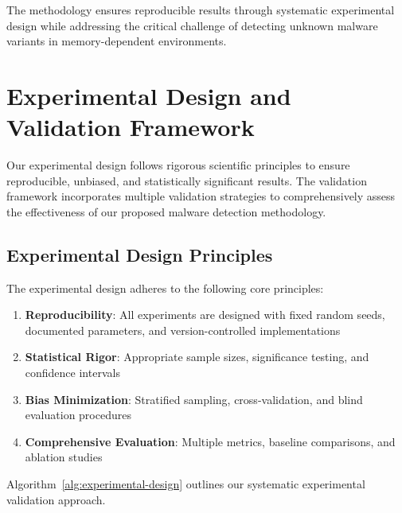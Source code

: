 The methodology ensures reproducible results through systematic experimental design while addressing the critical challenge of detecting unknown malware variants in memory-dependent environments.

\section{Experimental Design and Validation Framework}
\label{sec:experimental-design}

Our experimental design follows rigorous scientific principles to ensure reproducible, unbiased, and statistically significant results. The validation framework incorporates multiple validation strategies to comprehensively assess the effectiveness of our proposed malware detection methodology.

\subsection{Experimental Design Principles}
\label{subsec:design-principles}

The experimental design adheres to the following core principles:

\begin{enumerate}
    \item \textbf{Reproducibility}: All experiments are designed with fixed random seeds, documented parameters, and version-controlled implementations
    \item \textbf{Statistical Rigor}: Appropriate sample sizes, significance testing, and confidence intervals
    \item \textbf{Bias Minimization}: Stratified sampling, cross-validation, and blind evaluation procedures
    \item \textbf{Comprehensive Evaluation}: Multiple metrics, baseline comparisons, and ablation studies
\end{enumerate}

Algorithm~\ref{alg:experimental-design} outlines our systematic experimental validation approach.

